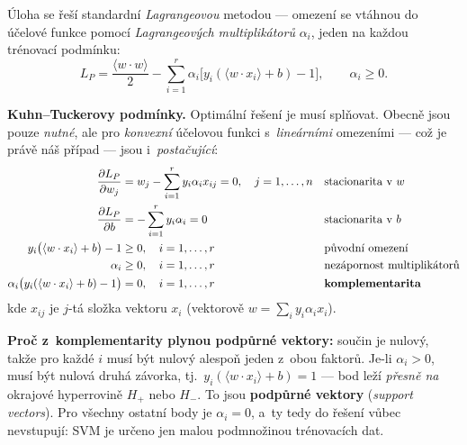 \documentclass[11pt,a4paper]{article}
\theoremstyle{definition}
\begin{document}
\begin{defbox}
Úloha se řeší standardní \emph{Lagrangeovou} metodou --- omezení se vtáhnou do účelové funkce
pomocí \emph{Lagrangeových multiplikátorů} $\alpha_i$, jeden na každou trénovací podmínku:
\[ L_P=\frac{\langle w\cdot w\rangle}{2}-\sum_{i=1}^{r}\alpha_i
   \big[y_i(\langle w\cdot x_i\rangle+b)-1\big],\qquad \alpha_i\ge 0. \]

\textbf{Kuhn--Tuckerovy podmínky.} Optimální řešení je musí splňovat. Obecně jsou pouze
\emph{nutné}, ale pro \emph{konvexní} účelovou funkci s~\emph{lineárními} omezeními --- což je
právě náš případ --- jsou i~\emph{postačující}:
\begin{align*}
\frac{\partial L_P}{\partial w_j} &= w_j - \sum_{i=1}^{r} y_i\alpha_i x_{ij} = 0,
  \quad j=1,\dots,n && \text{stacionarita v~}w\\
\frac{\partial L_P}{\partial b} &= -\sum_{i=1}^{r} y_i\alpha_i = 0
  && \text{stacionarita v~}b\\
y_i\big(\langle w\cdot x_i\rangle+b\big)-1 &\ge 0, \quad i=1,\dots,r
  && \text{původní omezení}\\
\alpha_i &\ge 0, \quad i=1,\dots,r && \text{nezápornost multiplikátorů}\\
\alpha_i\big(y_i(\langle w\cdot x_i\rangle+b)-1\big) &= 0, \quad i=1,\dots,r
  && \text{\textbf{komplementarita}}
\end{align*}
kde $x_{ij}$ je $j$-tá složka vektoru $x_i$ (vektorově $w=\sum_i y_i\alpha_i x_i$).

\textbf{Proč z~komplementarity plynou podpůrné vektory:} součin je nulový, takže pro každé $i$
musí být nulový alespoň jeden z~obou faktorů. Je-li $\alpha_i>0$, musí být nulová druhá
závorka, tj.\ $y_i(\langle w\cdot x_i\rangle+b)=1$ --- bod leží \emph{přesně na} okrajové
hyperrovině $H_+$ nebo $H_-$. To jsou \textbf{podpůrné vektory} (\emph{support vectors}).
Pro všechny ostatní body je $\alpha_i=0$, a~ty tedy do řešení vůbec nevstupují: SVM je určeno
jen malou podmnožinou trénovacích dat.


\end{defbox}
\end{document}
